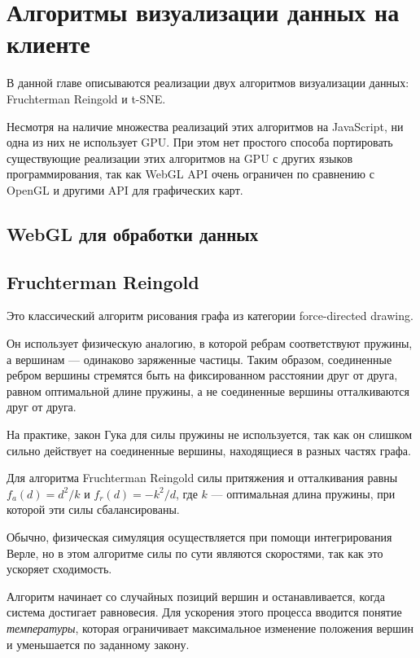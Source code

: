 
\usepackage{setspace}


\chapter{Алгоритмы визуализации данных на клиенте}

В данной главе описываются реализации двух алгоритмов визуализации данных: Fruchterman Reingold и t-SNE.

Несмотря на наличие множества реализаций этих алгоритмов на JavaScript, ни одна из них не использует GPU. При этом нет простого способа портировать существующие реализации этих алгоритмов на GPU с других языков программирования, так как WebGL API очень ограничен по сравнению с OpenGL и другими API для графических карт.

\section{WebGL для обработки данных}



\section{Fruchterman Reingold}

Это классический алгоритм рисования графа из категории force-directed drawing.

Он использует физическую аналогию, в которой ребрам соответствуют пружины, а вершинам --- одинаково заряженные частицы. Таким образом, соединенные ребром вершины стремятся быть на фиксированном расстоянии друг от друга, равном оптимальной длине пружины, а не соединенные вершины отталкиваются друг от друга.

На практике, закон Гука для силы пружины не используется, так как он слишком сильно действует на соединенные вершины, находящиеся в разных частях графа.

Для алгоритма Fruchterman Reingold силы притяжения и отталкивания равны $f_a(d) = d^2 / k$ и $f_r(d) = -k^2 / d$, где $k$ --- оптимальная длина пружины, при которой эти силы сбалансированы.

Обычно, физическая симуляция осуществляется при помощи интегрирования Верле, но в этом алгоритме силы по сути являются скоростями, так как это ускоряет сходимость.

Алгоритм начинает со случайных позиций вершин и останавливается, когда система достигает равновесия. Для ускорения этого процесса вводится понятие {\itshape температуры}, которая ограничивает максимальное изменение положения вершин и уменьшается по заданному закону.

